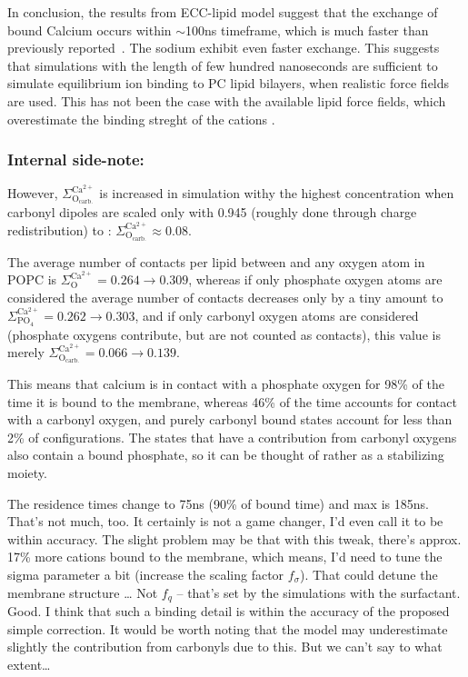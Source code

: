 \documentclass[aip,jcp,twocolumn]{revtex4}
\begin{document}
In conclusion, the results from ECC-lipid model suggest that the
exchange of bound Calcium occurs within $\sim$100ns timeframe,
which is much faster than previously reported~\cite{javanainen17}.
The sodium exhibit even faster exchange.
This suggests that simulations with the length of few hundred
nanoseconds are sufficient to simulate equilibrium ion binding
to PC lipid bilayers, when realistic force fields are used.
This has not been the case with the available lipid force fields,
which overestimate the binding streght of the cations \cite{javanainen17,catte16}.


\subsubsection{Internal side-note: }
However, $\Sigma ^\mathrm{Ca^{2+}} _\mathrm{O_{carb.}}$ is increased 
in simulation withy the highest  concentration
when carbonyl dipoles are scaled only with 0.945 
(roughly done through charge redistribution)
 to : $\Sigma ^\mathrm{Ca^{2+}} _\mathrm{O_{carb.}} \approx 0.08 $.    %

The average number of contacts per lipid between  and any oxygen atom in POPC is 
$\Sigma ^\mathrm{Ca^{2+}} _\mathrm{O} = 0.264 \rightarrow 0.309 $,
whereas if only phosphate oxygen atoms are considered 
the average number of contacts decreases only by a tiny amount to 
$\Sigma ^\mathrm{Ca^{2+}} _\mathrm{PO_4} = 0.262 \rightarrow 0.303 $,    %
and if only carbonyl oxygen atoms are considered 
(phosphate oxygens contribute, but are not counted as contacts),
this value is merely
$\Sigma ^\mathrm{Ca^{2+}} _\mathrm{O_{carb.}} = 0.066 \rightarrow 0.139 $.    %

This means that calcium is in contact with a phosphate oxygen for 98\% of the time it is bound to the membrane, 
whereas 46\% of the time accounts for contact with a carbonyl oxygen,
and purely carbonyl bound states account for less than 2\% of configurations. 
The states that have a contribution from carbonyl oxygens also contain a bound phosphate, 
so it can be thought of rather as a stabilizing moiety. 

The residence times change to 75ns (90\% of bound time) and max is 185ns.
That's not much, too. It certainly is not a game changer, I'd even call it to be within accuracy. 
The slight problem may be that with this tweak, there's approx. 17\%  more cations bound to the membrane,
which means, I'd need to tune the sigma parameter a bit (increase the scaling factor $f_\sigma$). 
That could detune the membrane structure \dots
Not $f_q$ -- that's set by the simulations with the surfactant. Good.
I think that such a binding detail is within the accuracy of the proposed simple correction.
It would be worth noting that the model may underestimate slightly the contribution from carbonyls due to this. 
But we can't say to what extent\dots
\end{document}
